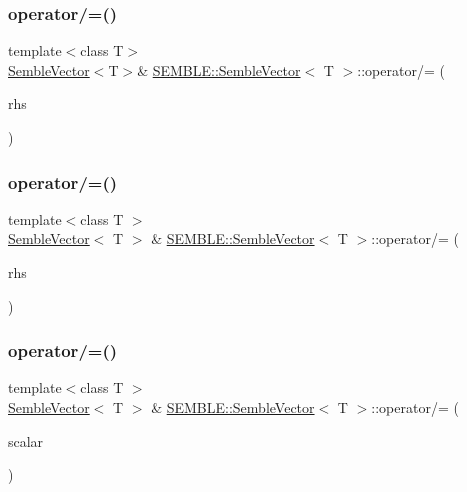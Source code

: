\subsubsection{\texorpdfstring{operator/=()}{operator/=()}\hspace{0.1cm}{\footnotesize\ttfamily [1/6]}}
{\footnotesize\ttfamily template$<$class T$>$ \\
\mbox{\hyperlink{structSEMBLE_1_1SembleVector}{Semble\+Vector}}$<$T$>$\& \mbox{\hyperlink{structSEMBLE_1_1SembleVector}{S\+E\+M\+B\+L\+E\+::\+Semble\+Vector}}$<$ T $>$\+::operator/= (\begin{DoxyParamCaption}\item[{const T \&}]{rhs }\end{DoxyParamCaption})}

\mbox{\label{structSEMBLE_1_1SembleVector_aac4281bd3ba03a4b1d1835cbcf1907d0}} 
\subsubsection{\texorpdfstring{operator/=()}{operator/=()}\hspace{0.1cm}{\footnotesize\ttfamily [2/6]}}
{\footnotesize\ttfamily template$<$class T $>$ \\
\mbox{\hyperlink{structSEMBLE_1_1SembleVector}{Semble\+Vector}}$<$ T $>$ \& \mbox{\hyperlink{structSEMBLE_1_1SembleVector}{S\+E\+M\+B\+L\+E\+::\+Semble\+Vector}}$<$ T $>$\+::operator/= (\begin{DoxyParamCaption}\item[{const T \&}]{rhs }\end{DoxyParamCaption})}

\mbox{\label{structSEMBLE_1_1SembleVector_a4158fb12d451d53f12b9f922d8106630}} 
\subsubsection{\texorpdfstring{operator/=()}{operator/=()}\hspace{0.1cm}{\footnotesize\ttfamily [3/6]}}
{\footnotesize\ttfamily template$<$class T $>$ \\
\mbox{\hyperlink{structSEMBLE_1_1SembleVector}{Semble\+Vector}}$<$ T $>$ \& \mbox{\hyperlink{structSEMBLE_1_1SembleVector}{S\+E\+M\+B\+L\+E\+::\+Semble\+Vector}}$<$ T $>$\+::operator/= (\begin{DoxyParamCaption}\item[{const typename \mbox{\hyperlink{structSEMBLE_1_1PromoteScalar}{Promote\+Scalar}}$<$ T $>$\+::Type \&}]{scalar }\end{DoxyParamCaption})}

